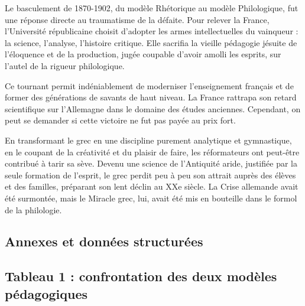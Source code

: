 Le basculement de 1870-1902, du modèle Rhétorique au modèle Philologique, fut une réponse directe au
traumatisme de la défaite. Pour relever la France, l'Université républicaine choisit d'adopter les
armes intellectuelles du vainqueur : la science, l'analyse, l'histoire critique. Elle sacrifia la
vieille pédagogie jésuite de l'éloquence et de la production, jugée coupable d'avoir amolli les
esprits, sur l'autel de la rigueur philologique.

Ce tournant permit indéniablement de moderniser l'enseignement français et de former des générations
de savants de haut niveau. La France rattrapa son retard scientifique sur l'Allemagne dans le
domaine des études anciennes. Cependant, on peut se demander si cette victoire ne fut pas payée au
prix fort.

En transformant le grec en une discipline purement analytique et \og gymnastique\fg{}, en le coupant
de la créativité et du plaisir de \og faire\fg{}, les réformateurs ont peut-être contribué à tarir
sa sève. Devenu une \og science de l'Antiquité\fg{} aride, justifiée par la seule formation de
l'esprit, le grec perdit peu à peu son attrait auprès des élèves et des familles, préparant son lent
déclin au XXe siècle. La \og Crise allemande\fg{} avait été surmontée, mais le \og Miracle
grec\fg{}, lui, avait été mis en bouteille dans le formol de la philologie.



\subsection{Annexes et données structurées}



\subsection{Tableau 1 : confrontation des deux modèles pédagogiques}

